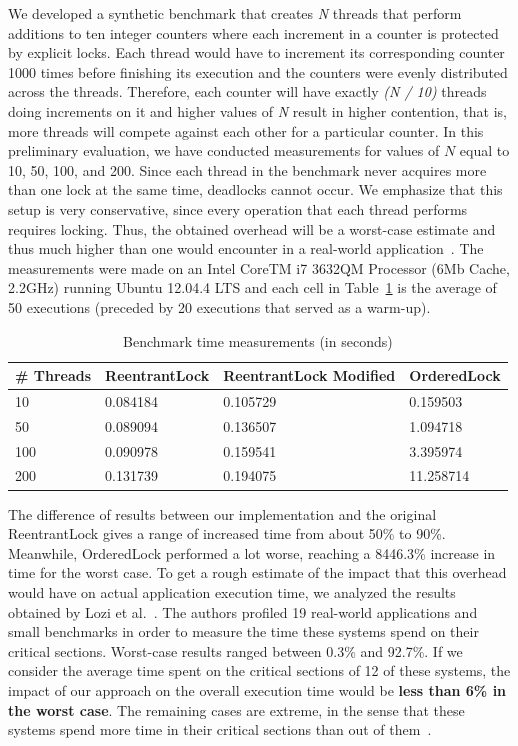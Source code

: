 We developed a synthetic benchmark that creates \emph{N} threads that perform additions to ten integer counters where each increment in a counter is protected by explicit locks. Each thread would have to increment its corresponding counter 1000 times before finishing its execution and the counters were evenly distributed across the threads. Therefore, each counter will have exactly \emph{(N / 10)} threads doing increments on it and higher values of \emph{N} result in higher contention, that is, more threads will compete against each other for a particular counter. In this preliminary evaluation, we have conducted measurements for values of $N$ equal to 10, 50, 100, and 200. Since each thread in the benchmark never acquires more than one lock at the same time, deadlocks cannot occur. We emphasize that this setup is very conservative, since every operation that each thread performs requires locking. Thus, the obtained overhead will be a worst-case estimate and thus much higher than one would encounter in a real-world application~\cite{lozi}. The measurements were made on an Intel CoreTM i7 3632QM Processor (6Mb Cache, 2.2GHz) running Ubuntu 12.04.4 LTS and each cell in Table~\ref{tab:overhead} is the average of 50 executions (preceded by 20 executions that served as a warm-up).

\begin{table}
\begin{center}
\caption{Benchmark time measurements (in seconds)}\label{tab:overhead}
\begin{tabular}{|l|l|l|l|}
\hline
\# Threads & ReentrantLock & ReentrantLock Modified & OrderedLock \\
\hline
10 & 0.084184 & 0.105729 & 0.159503\\
50 & 0.089094 & 0.136507 & 1.094718\\
100 & 0.090978 & 0.159541 & 3.395974\\
200 & 0.131739 & 0.194075 & 11.258714\\
\hline
\end{tabular}
\end{center}
\end{table}

The difference of results between our implementation and the original ReentrantLock gives a range of increased time from about 50\% to 90\%. Meanwhile, OrderedLock performed a lot worse, reaching a 8446.3\% increase in time for the worst case. To get a rough estimate of the impact that this overhead would have on actual application execution time, we analyzed the results obtained by Lozi et al.~\cite{lozi}. The authors profiled 19 real-world applications and small benchmarks in order to measure the time these systems spend on their critical sections. Worst-case results ranged between 0.3\% and 92.7\%. If we consider the average time spent on the critical sections of 12 of these systems, the impact of our approach on the overall execution time would be \textbf{less than 6\% in the worst case}. The remaining cases are extreme, in the sense that these systems spend more time in their critical sections than out of them~\cite{lozi}. 



